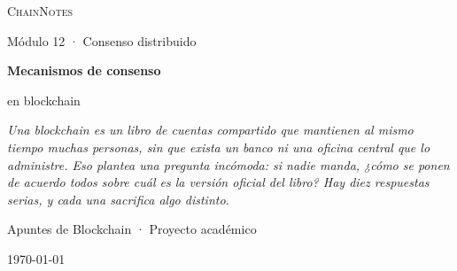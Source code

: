\documentclass[11pt,a4paper]{article}
\theoremstyle{definition}
\theoremstyle{plain}
\theoremstyle{remark}
\begin{document}

\makeatletter
\DeclareRobustCommand{\%}{\char`\%\relax}
\makeatother

\begin{titlepage}
\centering
\vspace*{2.5cm}

{\Large\color{violetdeep}\textsc{ChainNotes}\par}
{\small\color{inkc}Módulo 12 · Consenso distribuido\par}

\vspace{1.4cm}
{\Huge\bfseries Mecanismos de consenso\par}
\vspace{0.4cm}
{\LARGE en blockchain\par}

\vspace{1.2cm}
\begin{minipage}{0.78\textwidth}
\centering\itshape\color{inkc}
Una blockchain es un libro de cuentas compartido que mantienen al mismo tiempo
muchas personas, sin que exista un banco ni una oficina central que lo
administre. Eso plantea una pregunta incómoda: si nadie manda, ¿cómo se ponen de
acuerdo todos sobre cuál es la versión oficial del libro? Hay diez respuestas
serias, y cada una sacrifica algo distinto.
\end{minipage}

\vspace{1.6cm}

\vfill
{\small Apuntes de Blockchain · Proyecto académico\par}
{\small\color{inkc}\today\par}
\end{titlepage}
\end{document}
